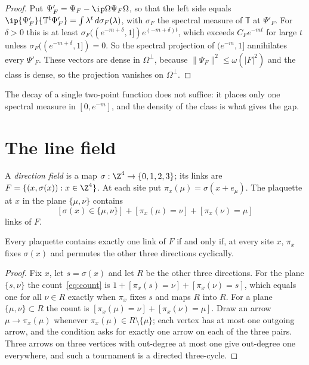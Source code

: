 \begin{proof}
Put $\Psi'_F=\Psi_F-\ip\Omega{\Psi_F}\Omega$, so that the left side equals
$\ip{\Psi'_F}{\mathbb T^t\Psi'_F}=\int\lambda^t\,d\sigma_F(\lambda)$, with
$\sigma_F$ the spectral measure of $\mathbb T$ at $\Psi'_F$. For $\delta>0$
this is at least $\sigma_F((e^{-m+\delta},1])e^{(-m+\delta)t}$, which exceeds
$C_Fe^{-mt}$ for large $t$ unless $\sigma_F((e^{-m+\delta},1])=0$. So the
spectral projection of $(e^{-m},1]$ annihilates every $\Psi'_F$. These vectors
are dense in $\Omega^\perp$, because $\|\Psi_F\|^2\le\omega(|F|^2)$ and the
class is dense, so the projection vanishes on $\Omega^\perp$.
\end{proof}

The decay of a single two-point function does not suffice: it places only
one spectral measure in $[0,e^{-m}]$, and the density of the class is what
gives the gap.

\section{The line field}\label{sec:linefield}

A \emph{direction field} is a map $\sigma:\Z^4\to\{0,1,2,3\}$; its links
are $F=\{(x,\sigma(x)):x\in\Z^4\}$. At each site put $\pi_x(\mu)=
\sigma(x+e_\mu)$. The plaquette at $x$ in the plane $\{\mu,\nu\}$ contains
\begin{equation}\label{eq:count}
[\sigma(x)\in\{\mu,\nu\}]+[\pi_x(\mu)=\nu]+[\pi_x(\nu)=\mu]
\end{equation}
links of $F$.

\begin{lemma}\label{lem:cycle}
Every plaquette contains exactly one link of $F$ if and only if, at every
site $x$, $\pi_x$ fixes $\sigma(x)$ and permutes the other three directions
cyclically.
\end{lemma}

\begin{proof}
Fix $x$, let $s=\sigma(x)$ and let $R$ be the other three directions. For the
plane $\{s,\nu\}$ the count~\eqref{eq:count} is $1+[\pi_x(s)=\nu]+[\pi_x(\nu)
=s]$, which equals one for all $\nu\in R$ exactly when $\pi_x$ fixes $s$ and
maps $R$ into $R$. For a plane $\{\mu,\nu\}\subset R$ the count is
$[\pi_x(\mu)=\nu]+[\pi_x(\nu)=\mu]$. Draw an arrow $\mu\to\pi_x(\mu)$ whenever
$\pi_x(\mu)\in R\setminus\{\mu\}$; each vertex has at most one outgoing arrow,
and the condition asks for exactly one arrow on each of the three pairs. Three
arrows on three vertices with out-degree at most one give out-degree one
everywhere, and such a tournament is a directed three-cycle.
\end{proof}

